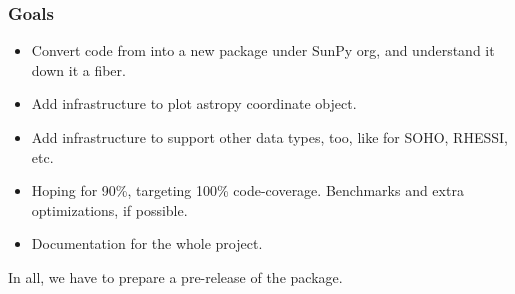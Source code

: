 \subsubsection{Goals}

\begin{itemize}
    \item Convert code from \pr into a new package under SunPy org, and understand it down it a fiber.
    \item Add infrastructure to plot astropy coordinate object.
    \item Add infrastructure to support other data types, too, like for SOHO, RHESSI, etc.
    \item Hoping for 90\%, targeting 100\% code-coverage. Benchmarks and extra optimizations, if possible.
    \item Documentation for the whole project.
\end{itemize}

In all, we have to prepare a pre-release of the package.
